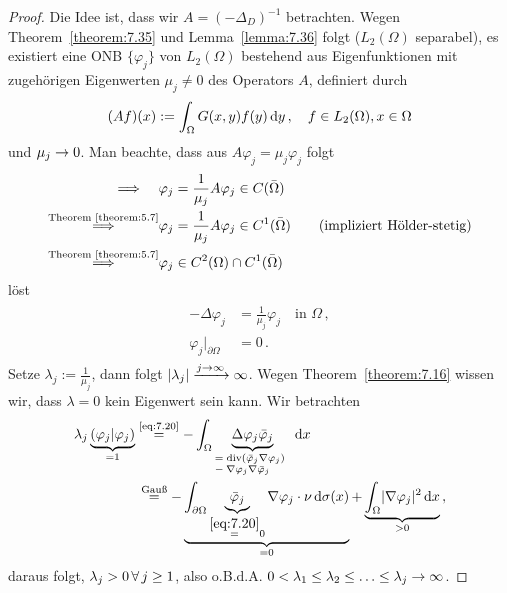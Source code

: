 \begin{proof}
Die Idee ist, dass wir $A=(-\Delta_D)^{-1}$ betrachten. Wegen Theorem~\ref{theorem:7.35} und Lemma~\ref{lemma:7.36} folgt ($L_2(\Omega)$ separabel), es existiert eine ONB $\{\varphi_j\}$ von $L_2(\Omega)$ bestehend aus Eigenfunktionen mit zugehörigen Eigenwerten $\mu_j \neq 0$ des Operators $A$, definiert durch
\[
	(Af)(x) := \int_\Omega G(x,y)f(y) \,\mathrm{d} y \, , \quad f\in L_2(\Omega) , x \in \Omega 
\] 
und $\mu_j \rightarrow 0$. Man beachte, dass aus $A\varphi_j = \mu_j \varphi_j$ folgt
\begin{align*}
\label{eq:7.20}
\Longrightarrow \, \, \quad  & \varphi_j = \frac 1{\mu_j} A\varphi_j \in C(\bar \Omega) \\
\stackrel{\scriptsize\text{Theorem}~\ref{theorem:5.7}}{\Longrightarrow} & \varphi_j = \frac 1{\mu_j} A\varphi_j \in C^1(\bar\Omega) \qquad (\text{impliziert Hölder-stetig})  \\
\stackrel{\scriptsize\text{Theorem}~\ref{theorem:5.7}}{\Longrightarrow} & \varphi_j \in C^2(\Omega) \cap C^1(\bar\Omega)  \\
\end{align*}
löst
\begin{align}
\begin{aligned}
-\Delta \varphi_j & = \frac 1{\mu_j} \varphi_j \quad \text{in } \Omega \, , \\
\varphi_j|_{\partial \Omega}& = 0 \, .
\end{aligned}
\end{align}
Setze $\lambda_j := \frac 1{\mu_j}$, dann folgt $\lvert \lambda_j\rvert \xrightarrow{j\rightarrow\infty} \infty$. Wegen Theorem~\ref{theorem:7.16} wissen wir, dass $\lambda = 0$ kein Eigenwert sein kann. Wir betrachten
\begin{align*}
	\lambda_j\underbrace{(\varphi_j \vert \varphi_j)}_{=1} & \stackrel{\scriptsize\eqref{eq:7.20}}= - \int_\Omega \underbrace{\Delta \varphi_j \bar \varphi_j}_{\parbox{1.9cm}{\scriptsize$=\div (\bar\varphi_j \nabla \varphi_j)\\ - \nabla \varphi_j \nabla \bar\varphi_j$}} \d x \\
	&\,  \stackrel{\scriptsize\text{Gauß}}= - \underbrace{\int_{\partial\Omega} \underbrace{\bar\varphi_j}_{\stackrel{\eqref{eq:7.20}}= 0} \nabla \varphi_j \cdot \nu \d \sigma(x)}_{=0} + \underbrace{\int_\Omega \abs{\nabla \varphi_j}^2 \d x}_{>0} \, ,
\end{align*}
daraus folgt, $\lambda_j > 0 \, \forall \, j \geq1$, also o.B.d.A. $0 < \lambda_1 \leq \lambda_2 \leq \ldots \leq \lambda_j \rightarrow \infty$.


\end{proof}
